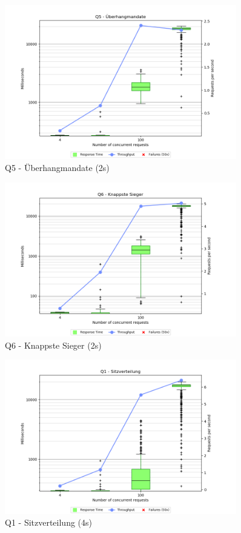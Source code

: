 \documentclass[a4paper]{scrreprt}
\begin{document}
\begin{figure}[h]
\centering
\includegraphics[width=0.9\textwidth]{images/plots_2s/Q5}
\caption {Q5 - Überhangmandate (2s)}
\end{figure}

\begin{figure}[h]
\centering
\includegraphics[width=0.9\textwidth]{images/plots_2s/Q6}
\caption {Q6 - Knappste Sieger (2s)}
\end{figure}

\begin{figure}[h]
\centering
\includegraphics[width=0.9\textwidth]{images/plots_4s/Q1}
\caption {Q1 - Sitzverteilung (4s)}
\end{figure}
\end{document}
